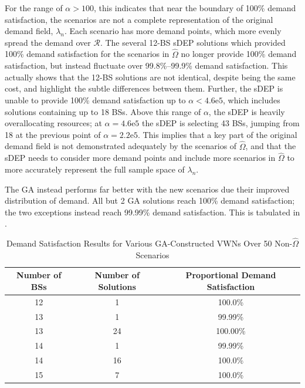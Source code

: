 \documentclass[12pt,dvipsnames]{report}
\newcommand{\expnumber}[2]{{#1}\mathrm{e}{#2}}
\begin{document}
For the range of $\alpha > 100$, this indicates that near the boundary of 100\% demand satisfaction, the scenarios are not a complete representation of the original demand field, $\lambda_n$.  Each scenario has more demand points, which more evenly spread the demand over $\mathcal{R}$.  The several 12-BS sDEP solutions which provided 100\% demand satisfaction for the scenarios in $\hat{\Omega}$ no longer provide 100\% demand satisfaction, but instead fluctuate over 99.8\%--99.9\% demand satisfaction.  This actually shows that the 12-BS solutions are not identical, despite being the same cost, and highlight the subtle differences between them.  Further, the sDEP is unable to provide 100\% demand satisfaction up to $\alpha < \expnumber{4.6}{5}$, which includes solutions containing up to 18 BSs.  Above this range of $\alpha$, the sDEP is heavily overallocating resources; at $\alpha = \expnumber{4.6}{5}$ the sDEP is selecting 43 BSs, jumping from 18 at the previous point of $\alpha = \expnumber{2.2}{5}$.  This implies that a key part of the original demand field is not demonstrated adequately by the scenarios of $\hat{\Omega}$, and that the sDEP needs to consider more demand points and include more scenarios in $\hat{\Omega}$ to more accurately represent the full sample space of $\lambda_n$.

The GA instead performs far better with the new scenarios due their improved distribution of demand.  All but 2 GA solutions reach 100\% demand satisfaction; the two exceptions instead reach 99.99\% demand satisfaction.  This is tabulated in .

\begin{table}[ht]
\centering
\caption[Preliminary Simulation Demand Satisfaction of GA-Constructed VWNs and New Scenarios]{Demand Satisfaction Results for Various GA-Constructed VWNs Over 50 Non-$\hat{\Omega}$ Scenarios}
\begin{tabular}{|c|c|c|} 
\hline
\textbf{Number of BSs} & \textbf{Number of Solutions} & \textbf{Proportional Demand Satisfaction} \\
\hline
12 & 1 & 100.0\% \\
\hline
13 & 1 & 99.99\% \\
\hline
13 & 24 & 100.00\% \\
\hline
14 & 1 & 99.99\% \\
\hline
14 & 16 & 100.0\% \\
\hline
15 & 7 & 100.0\% \\
\hline
\end{tabular}
\label{tab:Prelim_GAEvalDemandSatisfaction}
\end{table}
\end{document}
